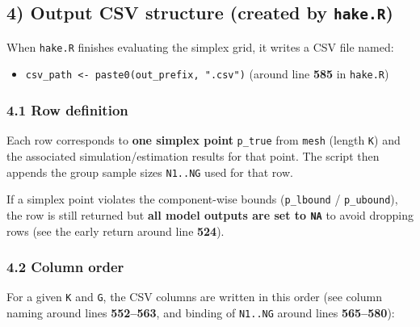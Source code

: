 \documentclass[
]{article}
\providecommand{\tightlist}{%
  \setlength{\itemsep}{0pt}\setlength{\parskip}{0pt}}
\begin{document}
\subsection{\texorpdfstring{4) Output CSV structure (created by
\texttt{hake.R})}{4) Output CSV structure (created by hake.R)}}\label{output-csv-structure-created-by-hake.r}

When \texttt{hake.R} finishes evaluating the simplex grid, it writes a
CSV file named:

\begin{itemize}
\tightlist
\item
  \texttt{csv\_path\ \textless{}-\ paste0(out\_prefix,\ ".csv")} (around
  line \textbf{585} in \texttt{hake.R})
\end{itemize}

\subsubsection{4.1 Row definition}\label{row-definition}

Each row corresponds to \textbf{one simplex point} \texttt{p\_true} from
\texttt{mesh} (length \texttt{K}) and the associated
simulation/estimation results for that point. The script then appends
the group sample sizes \texttt{N1..NG} used for that row.

If a simplex point violates the component-wise bounds
(\texttt{p\_lbound} / \texttt{p\_ubound}), the row is still returned but
\textbf{all model outputs are set to \texttt{NA}} to avoid dropping rows
(see the early return around line \textbf{524}).

\subsubsection{4.2 Column order}\label{column-order}

For a given \texttt{K} and \texttt{G}, the CSV columns are written in
this order (see column naming around lines \textbf{552--563}, and
binding of \texttt{N1..NG} around lines \textbf{565--580}):
\end{document}
